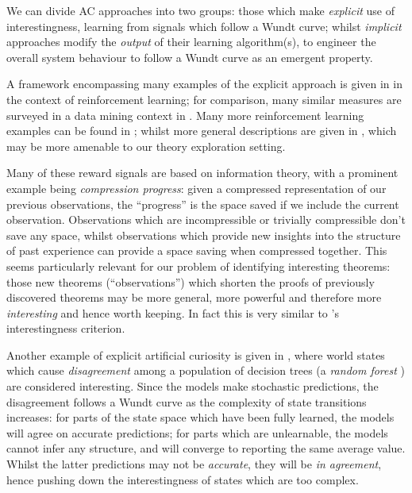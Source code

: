We can divide AC approaches into two groups: those which make \emph{explicit} use of interestingness, learning from signals which follow a Wundt curve; whilst \emph{implicit} approaches modify the \emph{output} of their learning algorithm(s), to engineer the overall system behaviour to follow a Wundt curve as an emergent property.

A framework encompassing many examples of the explicit approach is given in \citep{oudeyer2007intrinsic} in the context of reinforcement learning; for comparison, many similar measures are surveyed in a data mining context in \citep{geng2006interestingness}. Many more reinforcement learning examples can be found in \citep{Kaplan2006, Lipson2007, Luciw2011, Macedo2000, Ramik.Sabourin.Madani:2013, Roa.Kruijff.Jacobsson:2009, Schmidhuber:1991, oudeyer2004intelligent}; whilst more general descriptions are given in \citep{Schaul.Sun.Wierstra.ea:2011, Scott1989, maher2008achieving}, which may be more amenable to our theory exploration setting.

Many of these reward signals are based on information theory, with a prominent example being \emph{compression progress}: given a compressed representation of our previous observations, the ``progress'' is the space saved if we include the current observation. Observations which are incompressible or trivially compressible don't save any space, whilst observations which provide new insights into the structure of past experience can provide a space saving when compressed together. This seems particularly relevant for our problem of identifying interesting theorems: those new theorems (``observations'') which shorten the proofs of previously discovered theorems may be more general, more powerful and therefore more \emph{interesting} and hence worth keeping. In fact this is very similar to \qspec{}'s interestingness criterion.

Another example of explicit artificial curiosity is given in \citep{Hester.Stone:2012}, where world states which cause \emph{disagreement} among a population of decision trees (a \emph{random forest} \citep{randomforests}) are considered interesting. Since the models make stochastic predictions, the disagreement follows a Wundt curve as the complexity of state transitions increases: for parts of the state space which have been fully learned, the models will agree on accurate predictions; for parts which are unlearnable, the models cannot infer any structure, and will converge to reporting the same average value. Whilst the latter predictions may not be \emph{accurate}, they will be \emph{in agreement}, hence pushing down the interestingness of states which are too complex.

